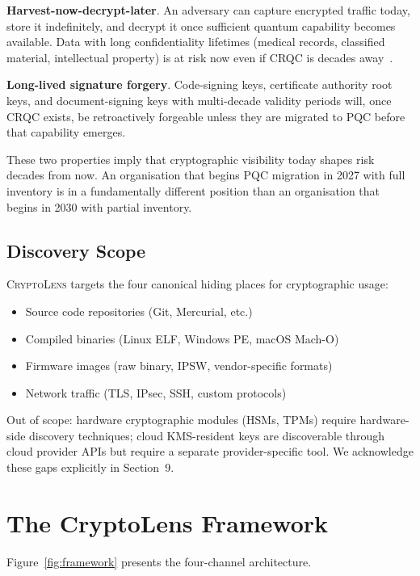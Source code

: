 \documentclass[sigconf,nonacm]{acmart}
\begin{document}
\textbf{Harvest-now-decrypt-later}. An adversary can capture
encrypted traffic today, store it indefinitely, and decrypt it once
sufficient quantum capability becomes available. Data with long
confidentiality lifetimes (medical records, classified material,
intellectual property) is at risk now even if CRQC is decades
away~\cite{mosca2024quantum}.

\textbf{Long-lived signature forgery}. Code-signing keys, certificate
authority root keys, and document-signing keys with multi-decade
validity periods will, once CRQC exists, be retroactively forgeable
unless they are migrated to PQC before that capability emerges.

These two properties imply that cryptographic visibility today
shapes risk decades from now. An organisation that begins PQC
migration in 2027 with full inventory is in a fundamentally
different position than an organisation that begins in 2030 with
partial inventory.

\subsection{Discovery Scope}

\textsc{CryptoLens} targets the four canonical hiding places for
cryptographic usage:

\begin{itemize}
  \item Source code repositories (Git, Mercurial, etc.)
  \item Compiled binaries (Linux ELF, Windows PE, macOS Mach-O)
  \item Firmware images (raw binary, IPSW, vendor-specific formats)
  \item Network traffic (TLS, IPsec, SSH, custom protocols)
\end{itemize}

Out of scope: hardware cryptographic modules (HSMs, TPMs) require
hardware-side discovery techniques; cloud KMS-resident keys are
discoverable through cloud provider APIs but require a separate
provider-specific tool. We acknowledge these gaps explicitly in
Section~9.

\section{The CryptoLens Framework}

Figure~\ref{fig:framework} presents the four-channel architecture.
\end{document}
